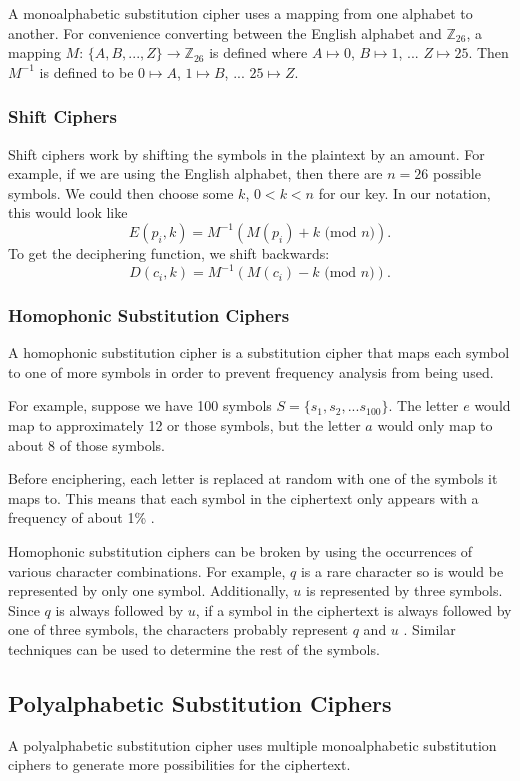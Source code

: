 \documentclass[12pt]{article}
\begin{document}
A monoalphabetic substitution cipher uses a mapping from one alphabet to another. For convenience converting between the English alphabet and $\mathbb{Z}_{26}$, a mapping $M$: $\{A,B,..., Z\} \rightarrow \mathbb{Z}_{26}$ is defined where $A\mapsto 0$, $B\mapsto 1$, ... $Z\mapsto 25$. Then $M^{-1}$ is defined to be $0\mapsto A$, $1\mapsto B$, ... $25\mapsto Z$.

\subsubsection{Shift Ciphers}
Shift ciphers work by shifting the symbols in the plaintext by an amount. For example, if we are using the English alphabet, then there are $n=26$ possible symbols. We could then choose some $k$, $0<k<n$ for our key. In our notation, this would look like
$$E(p_i,k)=M^{-1}(M(p_i)+k\text{ (mod $n$)}).$$
To get the deciphering function, we shift backwards:
$$D(c_i,k)=M^{-1}(M(c_i)-k\text{ (mod $n$)}).$$

\cite[pg. 98]{absalg}

\subsubsection{Homophonic Substitution Ciphers}
A homophonic substitution cipher is a substitution cipher that maps each symbol to one of more symbols in order to prevent frequency analysis from being used. 

For example, suppose we have 100 symbols $S=\{s_1,s_2,...s_{100}\}$. The letter $e$ would map to approximately 12 or those symbols, but the letter $a$ would only map to about 8 of those symbols.

Before enciphering, each letter is replaced at random with one of the symbols it maps to. This means that each symbol in the ciphertext only appears with a frequency of about 1\% \cite[pg. 53]{codebook}.

Homophonic substitution ciphers can be broken by using the occurrences of various character combinations. For example, $q$ is a rare character so is would be represented by only one symbol. Additionally, $u$ is represented by three symbols. Since $q$ is always followed by $u$, if a symbol in the ciphertext is always followed by one of three symbols, the characters probably represent $q$ and $u$ \cite[pg. 54]{codebook}. Similar techniques can be used to determine the rest of the symbols.

\subsection{Polyalphabetic Substitution Ciphers}
A polyalphabetic substitution cipher uses multiple monoalphabetic substitution ciphers to generate more possibilities for the ciphertext.
\end{document}
